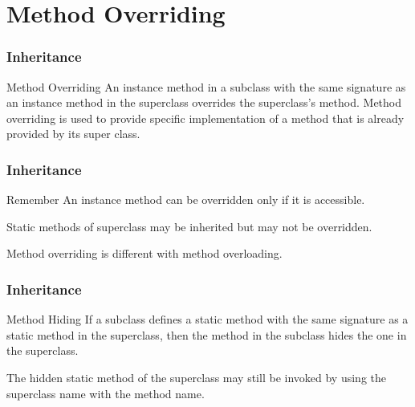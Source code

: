 \documentclass[10pt, compress]{beamer}
\begin{document}
\section{Method Overriding}

\begin{frame}[fragile]
  \frametitle{Inheritance}
  \begin{block}{Method Overriding}
    An instance method in a subclass with the same signature as an instance method in the superclass overrides the superclass's method. Method overriding is used to provide specific implementation of a method that is already provided by its super class.
  \end{block}
\end{frame}

\begin{frame}[fragile]
  \frametitle{Inheritance}
  \begin{block}{Remember}
    An instance method can be overridden only if it is accessible.

    Static methods of superclass may be inherited but may not be overridden.

    Method overriding is different with method overloading.
  \end{block}
\end{frame}

\begin{frame}[fragile]
  \frametitle{Inheritance}
  \begin{block}{Method Hiding}
    If a subclass defines a static method with the same signature as a static method in the superclass, then the method in the subclass hides the one in the superclass.

    The hidden static method of the superclass may still be invoked by using the superclass name with the method name.
  \end{block}
\end{frame}

\end{document}
